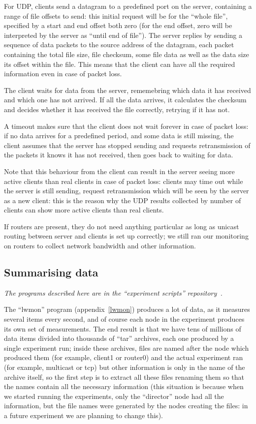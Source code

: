 \documentclass[a4paper,11pt,twocolumn]{article}
\begin{document}
For UDP, clients send a datagram to a predefined port on the server,
containing a range of file offsets to send: this initial request
will be for the ``whole file'', specified by a start and end offset
both zero (for the end offset, zero will be interpreted by the
server as ``until end of file''). The server replies by sending
a sequence of data packets to the source address of the datagram,
each packet containing the total file size, file checksum, some
file data as well as the data size its offset within the file.
This means that the client can have all the required information
even in case of packet loss.

The client waits for data from the server, rememebring which
data it has received and which one has not arrived.  If all
the data arrives, it calculates the checksum and decides
whether it has received the file correctly, retrying if it has
not.

A timeout makes sure that the client does not wait forever in case of
packet loss: if no data arrives for a predefined period, and some
data is still missing, the client assumes that the server has stopped
sending and requests retransmission of the packets it knows it has
not received, then goes back to waiting for data.

Note that this behaviour from the client can result in the server
seeing more active clients than real clients in case of packet loss:
clients may time out while the server is still sending, request
retransmission which will be seen by the server as a new client:
this is the reason why the UDP results collected by number of
clients can show more active clients than real clients.

If routers are present, they do not need anything particular as long
as unicast routing between server and clients is set up correctly;
we still ran our monitoring on routers to collect network bandwidth
and other information.

\subsection{Summarising data}
\label{summaries}

{\em The programs described here are in the ``experiment scripts''
repository~\cite{exp:scripts}.}

The ``lwmon'' program (appendix~\ref{lwmon}) produces a lot of data, as it
measures several items every second, and of course each node in the
experiment produces its own set of measurements.  The end result is that
we have tens of millions of data items divided into thousands of ``tar''
archives, each one produced by a single experiment run; inside these
archives, files are named after the node which produced them (for example,
client1 or router0) and the actual experiment ran (for example, multicast
or tcp) but other information is only in the name of the archive itself,
so the first step is to extract all these files renaming them so that
the names contain all the necessary information (this situation is because
when we started running the experiments, only the ``director'' node
had all the information, but the file names were generated by the nodes
creating the files: in a future experiment we are planning to change this).
\end{document}
